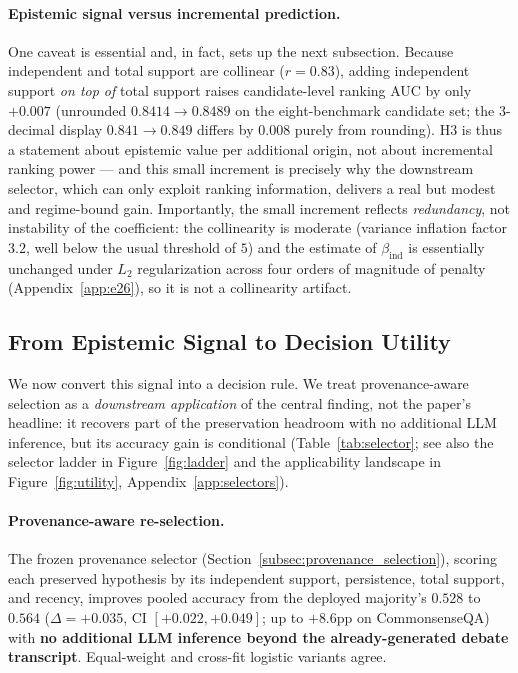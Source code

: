 \paragraph{Epistemic signal versus incremental prediction.}
\label{par:mechanism_prediction}
One caveat is essential and, in fact, sets up the next subsection. Because independent and total support
are collinear ($r=0.83$), adding independent support \emph{on top of} total support raises candidate-level
ranking AUC by only $+0.007$ (unrounded $0.8414\!\to\!0.8489$ on the eight-benchmark candidate set;
the $3$-decimal display $0.841\!\to\!0.849$ differs by $0.008$ purely from rounding). H3 is thus a
statement about epistemic value per additional origin, not about incremental ranking power --- and this
small increment is precisely why the downstream selector, which can only exploit ranking information,
delivers a real but modest and regime-bound gain. Importantly, the small increment reflects
\emph{redundancy}, not instability of the coefficient: the collinearity is moderate (variance inflation
factor $3.2$, well below the usual threshold of $5$) and the estimate of $\beta_{\mathrm{ind}}$ is
essentially unchanged under $L_2$ regularization across four orders of magnitude of penalty
(Appendix~\ref{app:e26}), so it is not a collinearity artifact.


\subsection{From Epistemic Signal to Decision Utility}
\label{subsec:decision_utility}

We now convert this signal into a decision rule. We treat provenance-aware selection as a
\emph{downstream application} of the central finding, not the paper's headline: it recovers part of the
preservation headroom with no additional LLM inference, but its accuracy gain is conditional
(Table~\ref{tab:selector}; see also the selector ladder in Figure~\ref{fig:ladder} and the applicability
landscape in Figure~\ref{fig:utility}, Appendix~\ref{app:selectors}).

\paragraph{Provenance-aware re-selection.}
\label{par:selector_results}
The frozen provenance selector (Section~\ref{subsec:provenance_selection}), scoring each preserved hypothesis by
its independent support, persistence, total support, and recency, improves pooled accuracy from the deployed
majority's $0.528$ to $0.564$ ($\Delta=+0.035$, CI $[+0.022,+0.049]$; up to $+8.6$pp on CommonsenseQA) with
\textbf{no additional LLM inference beyond the already-generated debate transcript}. Equal-weight and cross-fit logistic variants agree.


